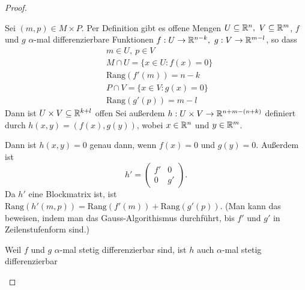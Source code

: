 \begin{proof}
	\begin{parts}
	\item Sei $(m,p)\in M\times P$. Per Definition gibt es offene Mengen $U\subseteq \mathbb{R}^n,~V\subseteq \mathbb{R}^m$, $f$ und $g$ $\alpha$-mal differenzierbare Funktionen $f:U\to \mathbb{R}^{n-k},~g:V\to \mathbb{R}^{m-l}$, so dass
		\begin{align*}
			&m\in U,~p\in V\\
			&M\cap U=\{x\in U:f(x)=0\}\\
			&\text{Rang}(f'(m))=n-k\\
			&P\cap V=\{x\in V:g(x)=0\} \\
			&\text{Rang}(g'(p))=m-l
		\end{align*}
		Dann ist $U\times V\subseteq \mathbb{R}^{k+l}$ offen Sei außerdem $h:U\times V\to \mathbb{R}^{n+m-(n+k)}$ definiert durch $h(x,y)=(f(x),g(y))$, wobei $x\in \mathbb{R}^{n}$ und $y\in \mathbb{R}^m$. 

Dann ist $h(x,y)=0$ genau dann, wenn $f(x)=0$ und $g(y)=0$. Außerdem ist
\[
	h'=\begin{pmatrix} f' & 0 \\ 0 & g' \end{pmatrix} 
.\] 
Da $h'$ eine Blockmatrix ist, ist $\text{Rang}(h'(m,p))=\text{Rang}(f'(m))+\text{Rang}(g'(p))$. (Man kann das beweisen, indem man das Gauss-Algorithismus durchführt, bis $f'$ und $g'$ in Zeilenstufenform sind.)

Weil $f$ und $g$ $\alpha$-mal stetig differenzierbar sind, ist $h$ auch $\alpha$-mal stetig differenzierbar


\end{parts}
\end{proof}
